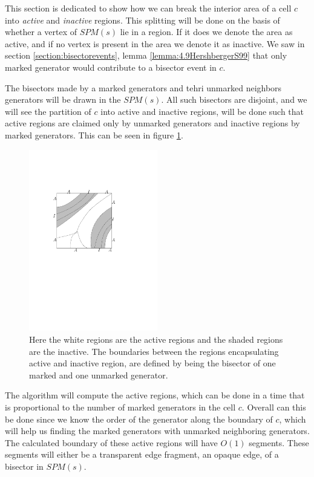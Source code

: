This section is dedicated to show how we can break the interior area of a cell $c$ into 
\textit{active} and \textit{inactive} regions. This splitting will be done on the basis of 
whether a vertex of $SPM(s)$ lie in a region. If it does we denote the area as active, and if 
no vertex is present in the area we denote it as inactive. We saw in section 
\ref{section:bisectorevents}, lemma \ref{lemma:4.9HershbergerS99} that only marked generator 
would contribute to a bisector event in $c$. 

The bisectors made by a marked generators and tehri unmarked neighbors generators will be drawn in the 
$SPM(s)$. All such bisectors are disjoint, and we will see the partition of $c$ into active 
and inactive regions, will be done such that active regions are claimed only by unmarked 
generators and inactive regions by marked generators. This can be seen in figure 
\ref{fig:activeinactiveregions}. 

\begin{figure}[H]
	\centering
	\includegraphics[width=0.5\textwidth]{figures/activeinactiveregions.pdf}
	\caption{Here the white regions are the active regions and the shaded regions are the inactive. The 
    		 boundaries between the regions encapsulating active and inactive region, are 
             defined by being the bisector of one marked and one unmarked generator\cite{HershbergerS99}.}
	\label{fig:activeinactiveregions}
\end{figure}

The algorithm will compute the active regions, which can be done in a time that is proportional to the 
number of marked generators in the cell $c$. Overall can this be done since we know the order of the 
generator along the boundary of $c$, which will help us finding the marked generators with unmarked 
neighboring generators. The calculated boundary of these active regions will have $O(1)$ segments. 
These segments will either be a transparent edge fragment, an opaque edge, of a bisector in $SPM(s)$.

